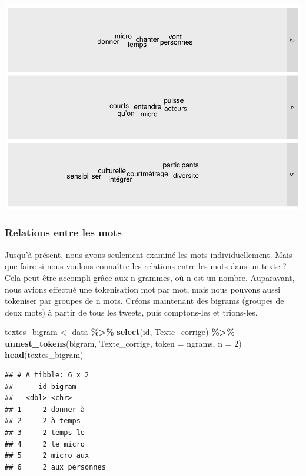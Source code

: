 \documentclass[
]{article}
\newenvironment{Shaded}{\begin{snugshade}}{\end{snugshade}}
\newcommand{\AttributeTok}[1]{\textcolor[rgb]{0.13,0.29,0.53}{#1}}
\newcommand{\DecValTok}[1]{\textcolor[rgb]{0.00,0.00,0.81}{#1}}
\newcommand{\FunctionTok}[1]{\textcolor[rgb]{0.13,0.29,0.53}{\textbf{#1}}}
\newcommand{\NormalTok}[1]{#1}
\newcommand{\OtherTok}[1]{\textcolor[rgb]{0.56,0.35,0.01}{#1}}
\newcommand{\SpecialCharTok}[1]{\textcolor[rgb]{0.81,0.36,0.00}{\textbf{#1}}}
\newcommand{\StringTok}[1]{\textcolor[rgb]{0.31,0.60,0.02}{#1}}
\begin{document}
\includegraphics{Texte_mining_files/figure-latex/unnamed-chunk-18-1.pdf}

\subsubsection{Relations entre les mots}\label{relations-entre-les-mots}

Jusqu'à présent, nous avons seulement examiné les mots individuellement.
Mais que faire si nous voulons connaître les relations entre les mots
dans un texte ? Cela peut être accompli grâce aux n-grammes, où n est un
nombre. Auparavant, nous avions effectué une tokenisation mot par mot,
mais nous pouvons aussi tokeniser par groupes de n mots. Créons
maintenant des bigrams (groupes de deux mots) à partir de tous les
tweets, puis comptons-les et trions-les.

\begin{Shaded}
\begin{Highlighting}[]
\NormalTok{textes\_bigram }\OtherTok{\textless{}{-}}\NormalTok{ data }\SpecialCharTok{\%\textgreater{}\%}
  \FunctionTok{select}\NormalTok{(id, Texte\_corrige) }\SpecialCharTok{\%\textgreater{}\%}
  \FunctionTok{unnest\_tokens}\NormalTok{(bigram, Texte\_corrige, }\AttributeTok{token =} \StringTok{\textquotesingle{}ngrams\textquotesingle{}}\NormalTok{, }\AttributeTok{n =} \DecValTok{2}\NormalTok{) }
\FunctionTok{head}\NormalTok{(textes\_bigram)}
\end{Highlighting}
\end{Shaded}

\begin{verbatim}
## # A tibble: 6 x 2
##      id bigram       
##   <dbl> <chr>        
## 1     2 donner à     
## 2     2 à temps      
## 3     2 temps le     
## 4     2 le micro     
## 5     2 micro aux    
## 6     2 aux personnes
\end{verbatim}
\end{document}
